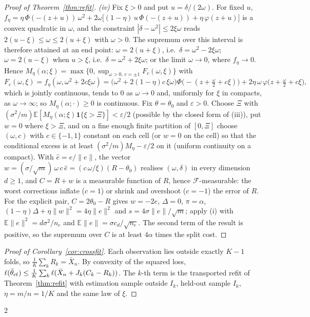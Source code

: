 \documentclass[10pt,a4paper]{article}
\theoremstyle{plain}
\theoremstyle{definition}
\theoremstyle{remark}
\newcommand{\E}{\mathbb{E}}
\newcommand{\norm}[1]{\lVert #1\rVert}
\begin{document}
\begin{proof}[Proof of Theorem~\ref{thm:refit}]
\noindent\textit{(iv)} Fix $\xi>0$ and put $u=\delta/(2\omega)$. For fixed $u$,
$f_\eta=\eta\,\Phi(-(z+u))\,\omega^2+2\omega\big[(1-\eta)\,u\,\Phi(-(z+u))+\eta\,\varphi(z+u)\big]$
is a convex quadratic in $\omega$, and the constraint $|\delta-\omega^2|\le2\xi\omega$ reads $2(u-\xi)\le\omega\le2(u+\xi)$ with $\omega>0$. The supremum over this interval is therefore attained at an end point: $\omega=2(u+\xi)$, i.e.\ $\delta=\omega^2-2\xi\omega$; $\omega=2(u-\xi)$ when $u>\xi$, i.e.\ $\delta=\omega^2+2\xi\omega$; or the limit $\omega\to0$, where $f_\eta\to0$. Hence $M_\eta(\alpha;\xi)=\max\{0,\sup_{\omega>0,\,c=\pm1}F_c(\omega,\xi)\}$ with
\[
F_c(\omega,\xi)=f_\eta(\omega,\omega^2+2c\xi\omega)=\big(\omega^2+2(1-\eta)c\,\xi\omega\big)\Phi\big(-(z+\tfrac\omega2+c\xi)\big)+2\eta\,\omega\,\varphi\big(z+\tfrac\omega2+c\xi\big),
\]
which is jointly continuous, tends to $0$ as $\omega\to0$ and, uniformly for $\xi$ in compacts, as $\omega\to\infty$; so $M_\eta(\alpha;\cdot)\ge0$ is continuous. Fix $\theta=\theta_0$ and $\varepsilon>0$. Choose $\Xi$ with $(\sigma^2/m)\E[M_\eta(\alpha;\xi)\mathbf 1\{\xi>\Xi\}]<\varepsilon/2$ (possible by the closed form of (iii)), put $w=0$ where $\xi>\Xi$, and on a fine enough finite partition of $[0,\Xi]$ choose $(\omega,c)$ with $c\in\{-1,1\}$ constant on each cell (or $w=0$ on the cell) so that the conditional excess is at least $(\sigma^2/m)M_\eta-\varepsilon/2$ on it (uniform continuity on a compact). With $\hat e=e/\norm e$, the vector $w=(\sigma/\sqrt m)\,\omega\,c\,\hat e=(c\,\omega/\xi)(R-\theta_0)$ realises $(\omega,\delta)$ in every dimension $d\ge1$, and $C=R+w$ is a measurable function of $R$, hence $\mathcal F$-measurable: the worst corrections inflate ($c=1$) or shrink and overshoot ($c=-1$) the error of $R$. For the explicit pair, $C=2\theta_0-R$ gives $w=-2e$, $\Delta=0$, $\pi=\alpha$, $(1-\eta)\Delta+\eta\norm w^2=4\eta\norm e^2$ and $s=4\sigma\norm e/\sqrt m$; apply (i) with $\E\norm e^2=d\sigma^2/n_e$ and $\E\norm e=\sigma c_d/\sqrt{n_e}$. The second term of the result is positive, so the supremum over $C$ is at least $4\alpha$ times the split cost.
\end{proof}

\begin{proof}[Proof of Corollary~\ref{cor:crossfit}]
Each observation lies outside exactly $K-1$ folds, so $\frac1K\sum_kR_k=\bar X_n$. By convexity of the squared loss, $\ell(\hat\theta_{\rm cf})\le\frac1K\sum_k\ell(\bar X_n+J_k(C_k-R_k))$. The $k$-th term is the transported refit of Theorem~\ref{thm:refit} with estimation sample outside $I_k$, held-out sample $I_k$, $\eta=m/n=1/K$ and the same law of $\xi$.
\end{proof}


{\footnotesize\setlength{\columnsep}{14pt}\begin{multicols}{2}\end{multicols}}
\end{document}
